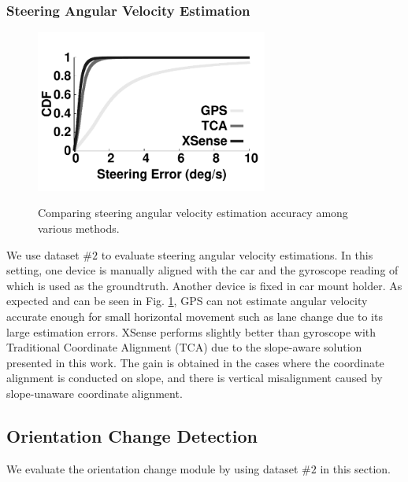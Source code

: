 \subsubsection{Steering Angular Velocity Estimation}


\begin{figure}[!htbp]
\begin{center}
\includegraphics[width=3.0in,angle=0]{Figs/DriveSense/evaluation/evaluation_steering.pdf}
\vspace{-0.2cm}
\caption{Comparing steering angular velocity estimation accuracy among various methods. }
\vspace{-0.3cm}
\label{xsense_steering}
\end{center}
\end{figure}

We use dataset $\#2$ to evaluate steering angular velocity 
estimations. 
In this setting, one device is manually aligned with
the car and the gyroscope reading of which is used
as the groundtruth. 
Another device is fixed in car mount holder.    
As expected and can be seen in Fig. \ref{xsense_steering}, 
GPS can not estimate angular velocity accurate enough
for small horizontal movement such as lane change due to
its large estimation errors. 
XSense performs slightly better than gyroscope with 
Traditional Coordinate Alignment (TCA) due to 
the slope-aware solution presented in this work. 
The gain is obtained in the cases where the coordinate
alignment is conducted on slope, and there is vertical
misalignment caused by slope-unaware coordinate alignment. 




\subsection{Orientation Change Detection}

We evaluate the orientation change module
by using dataset $\#2$ in this section. 


